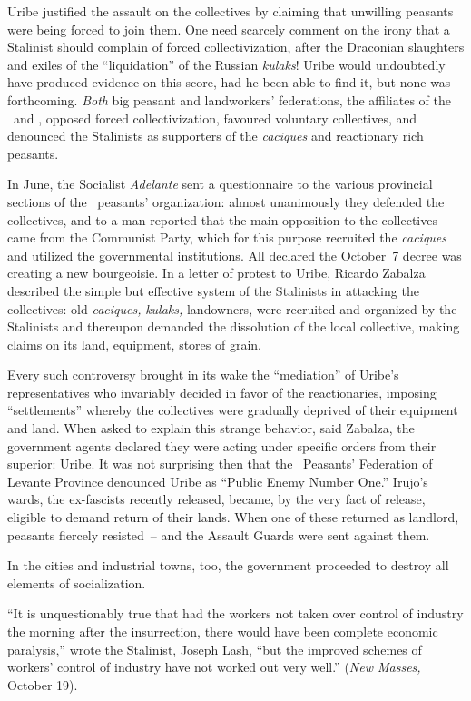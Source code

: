 Uribe justified the assault on the collectives by claiming that unwilling peasants were being forced to join them. One need scarcely comment on the irony that a Stalinist should complain of forced collectivization, after the Draconian slaughters and exiles of the ``liquidation'' of the Russian \emph{kulaks}! Uribe would undoubtedly have produced evidence on this score, had he been able to find it, but none was forthcoming. \emph{Both} big peasant and landworkers’ federations, the affiliates of the \CNT\ and \UGT, opposed forced collectivization, favoured voluntary collectives, and denounced the Stalinists as supporters of the \emph{caciques} and reactionary rich peasants.

In June, the Socialist \emph{Adelante} sent a questionnaire to the various provincial sections of the \UGT\ peasants’ organization: almost unanimously they defended the collectives, and to a man reported that the main opposition to the collectives came from the Communist Party, which for this purpose recruited the \emph{caciques} and utilized the governmental institutions. All declared the October~7 decree was creating a new bourgeoisie. In a letter of protest to Uribe, Ricardo Zabalza described the simple but effective system of the Stalinists in attacking the collectives: old \emph{caciques,} \emph{kulaks,} landowners, were recruited and organized by the Stalinists and thereupon demanded the dissolution of the local collective, making claims on its land, equipment, stores of grain.

Every such controversy brought in its wake the ``mediation'' of Uribe’s representatives who invariably decided in favor of the reactionaries, imposing ``settlements'' whereby the collectives were gradually deprived of their equipment and land. When asked to explain this strange behavior, said Zabalza, the government agents declared they were acting under specific orders from their superior: Uribe. It was not surprising then that the \UGT\ Peasants’ Federation of Levante Province denounced Uribe as ``Public Enemy Number One.'' Irujo’s wards, the ex-fascists recently released, became, by the very fact of release, eligible to demand return of their lands. When one of these returned as landlord, peasants fiercely resisted~-- and the Assault Guards were sent against them.

In the cities and industrial towns, too, the government proceeded to destroy all elements of socialization.

\medskip

``It is unquestionably true that had the workers not taken over control of industry the morning after the insurrection, there would have been complete economic paralysis,''
wrote the Stalinist, Joseph Lash,
``but the improved schemes of workers’ control of industry have not worked out very well.'' (\emph{New Masses,} October 19).

